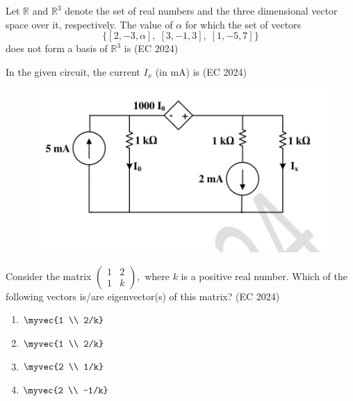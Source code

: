 \item Let $\mathbb{R}$ and $\mathbb{R}^3$ denote the set of real numbers and the three dimensional vector space over it, respectively. The value of $\alpha$ for which the set of vectors
\[
\{[2,-3,\alpha], \; [3,-1,3], \; [1,-5,7]\}
\]
does not form a basis of $\mathbb{R}^3$ is
 \hfill (EC 2024)
\item In the given circuit, the current $I_x$ (in mA) is
 \hfill (EC 2024)
\begin{figure}[H]\centering
\includegraphics[width=0.65\columnwidth]{GATE/2024/EC/figs/q31.png}
\caption{}
\label{fig:q31}
\end{figure}
\item Consider the matrix
$
\begin{pmatrix}
1 & 2 \\
1 & k
\end{pmatrix},
$
where $k$ is a positive real number. Which of the following vectors is/are eigenvector(s) of this matrix?
 \hfill (EC 2024)
\begin{multicols}{4}
\begin{enumerate}
    \item $\myvec{1 \\ 2/k}$
    \item $\myvec{1 \\ 2/k}$
    \item $\myvec{2 \\ 1/k}$
    \item $\myvec{2 \\ -1/k}$
\end{enumerate}
\end{multicols}

